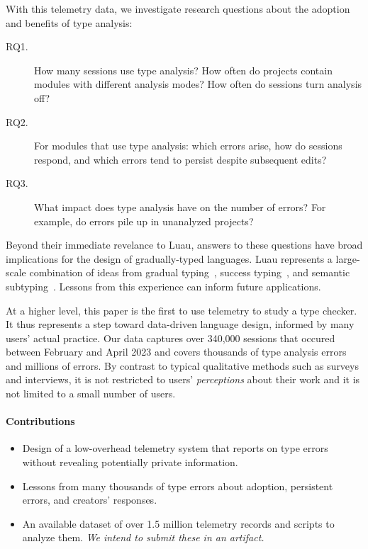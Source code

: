 \documentclass[english,submission,cleveref]{programming}
\begin{document}
With this telemetry data, we investigate research questions about
the adoption and benefits of type analysis:
\begin{description}
  \item[RQ1.]
    How many sessions use type analysis?
    How often do projects contain modules with different
    analysis modes?
    How often do sessions turn analysis off?
  \item[RQ2.]
    For modules that use type analysis:
    which errors arise,
    how do sessions respond,
    and which errors tend to persist despite subsequent edits?
  \item[RQ3.]
    What impact does type analysis have on the number of \FS{}
    errors?
    For example, do \FS{} errors pile up in unanalyzed projects?
\end{description}

Beyond their immediate revelance to {Luau},
answers to these questions have broad implications for the design
of gradually-typed languages.
Luau represents a large-scale combination of ideas from
gradual typing~\cite{st-sfp-2006,tfffgksst-snapl-2017,bat-ecoop-2014},
success typing~\cite{lindahl2006practical},
and semantic subtyping~\cite{CF05:GentleIntroduction,Jef22:SemanticSubtyping}.
Lessons from this experience can inform future applications.

At a higher level, this paper is the first to use telemetry 
to study a type checker.
It thus represents a step toward data-driven language design,
informed by many users' actual practice.
Our data captures over 340,000 sessions
that occured between February and April 2023
and covers thousands of type analysis errors
and millions of \FS{} errors.
By contrast to typical qualitative methods such as surveys and interviews, it
is not restricted to users' \emph{perceptions} about their work and it is not
limited to a small number of users.


\paragraph{Contributions}
\begin{itemize}
  \item
    Design of a low-overhead telemetry system
    that reports on type errors without revealing potentially private information.

  \item
    Lessons from many thousands of type errors about
    adoption, persistent errors, and creators' responses.

  \item
    An available dataset of over 1.5 million telemetry records
    and scripts to analyze them.
    \emph{We intend to submit these in an artifact.}

\end{itemize}
\end{document}
